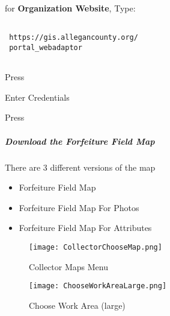  \vspace{.25in}

 for \textbf{Organization Website}, Type:
 \vspace{.25in}

 \begin{verbatim}

 https://gis.allegancounty.org/
 portal_webadaptor


 \end{verbatim}

 \vspace{.5in}

 \noindent Press \Large {} \lookArrow
 \vspace{2.75in}

 \noindent Enter Credentials
 \vspace{1in}

 \noindent Press \Large {} \lookArrow

 \clearpage
 \subparagraph[Download the Forfeiture Field Map]{Download the Forfeiture Field Map \texorpdfstring{\\}{}}
 \noindent There are 3 different versions of the map
 \vspace{.05in}

 \begin{itemize}
 \item Forfeiture Field Map
 \item Forfeiture Field Map For Photos
 \item Forfeiture Field Map For Attributes
 \end{itemize}

 \begin{wrapfigure}{r}{0.5\textwidth}
 \centering
     \texttt{[image: CollectorChooseMap.png]}
 \caption{Collector Maps Menu}
 \end{wrapfigure}

 \vspace{.5in}

 \vspace{1.25in}


 \clearpage
 \begin{wrapfigure}{r}{0.5\textwidth}
 \centering
     \texttt{[image: ChooseWorkAreaLarge.png]}
 \caption{Choose Work Area (large)}
 \end{wrapfigure}

